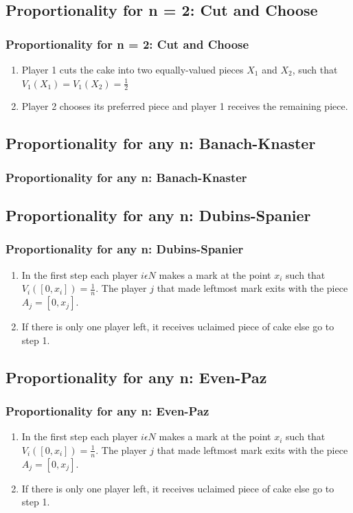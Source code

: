 \documentclass{beamer}
\begin{document}
\subsection{Proportionality for n = 2: Cut and Choose}
\begin{frame}
\frametitle{Proportionality for n = 2: Cut and Choose}
\begin{enumerate}
    \item Player 1 cuts the cake into two equally-valued pieces $X_1$ and $X_2$, such that $V_1(X_1)=V_1(X_2)=\frac{1}{2}$
    \item Player 2 chooses its preferred piece and player 1 receives the remaining piece.
\end{enumerate}
\end{frame}

\subsection{Proportionality for any n: Banach-Knaster}
\begin{frame}
\frametitle{Proportionality for any n: Banach-Knaster}

\end{frame}

\subsection{Proportionality for any n: Dubins-Spanier}
\begin{frame}
\frametitle{Proportionality for any n: Dubins-Spanier}
\begin{enumerate}
    \item In the first step each player $i\epsilon{N}$ makes a mark at the point $x_i$ such that $V_{i}([0,x_i])=\frac{1}{n}$. The player $j$ that made leftmost mark exits with the piece $A_j=[0, x_j]$.
    \item If there is only one player left, it receives uclaimed piece of cake else go to step 1.
\end{enumerate}
\end{frame}

\subsection{Proportionality for any n: Even-Paz}
\begin{frame}
\frametitle{Proportionality for any n: Even-Paz}
\begin{enumerate}
    \item In the first step each player $i\epsilon{N}$ makes a mark at the point $x_i$ such that $V_{i}([0,x_i])=\frac{1}{n}$. The player $j$ that made leftmost mark exits with the piece $A_j=[0, x_j]$.
    \item If there is only one player left, it receives uclaimed piece of cake else go to step 1.
\end{enumerate}

\end{frame}
\end{document}
